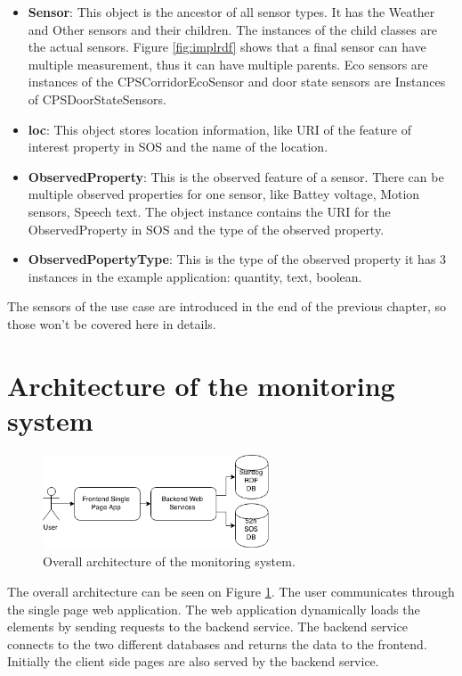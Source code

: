 \begin{itemize}
\item \textbf{Sensor}: This object is the ancestor of all sensor types. It has the Weather and Other sensors and their children. The instances of the child classes are the actual sensors. Figure \ref{fig:implrdf} shows that a final sensor can have multiple measurement, thus it can have multiple parents. Eco sensors are instances of the CPSCorridorEcoSensor and door state sensors are Instances of CPSDoorStateSensors. 
\item \textbf{loc}: This object stores location information, like URI of the feature of interest property in SOS and the name of the location. 
\item \textbf{ObservedProperty}: This is the observed feature of a sensor. There can be multiple observed properties for one sensor, like Battey voltage, Motion sensors, Speech text. The object instance contains the URI for the ObservedProperty in SOS and the type of the observed property.
\item \textbf{ObservedPopertyType}: This is the type of the observed property it has 3 instances in the example application: quantity, text, boolean.
\end{itemize}
 
The sensors of the use case are introduced in the end of the previous chapter, so those won't be covered here in details.
  
\section{Architecture of the monitoring system}

\begin{figure}[h]
\centering
\includegraphics[width=0.6\textwidth]{figures/softwareArch.png}
\caption{Overall architecture of the monitoring system.\label{fig:overallarch}}
\end{figure}

The overall architecture can be seen on Figure \ref{fig:overallarch}. The user communicates through the single page web application. The web application dynamically loads the elements by sending requests to the backend service. The backend service connects to the two different databases and returns the data to the frontend. Initially the client side pages are also served by the backend service. 

